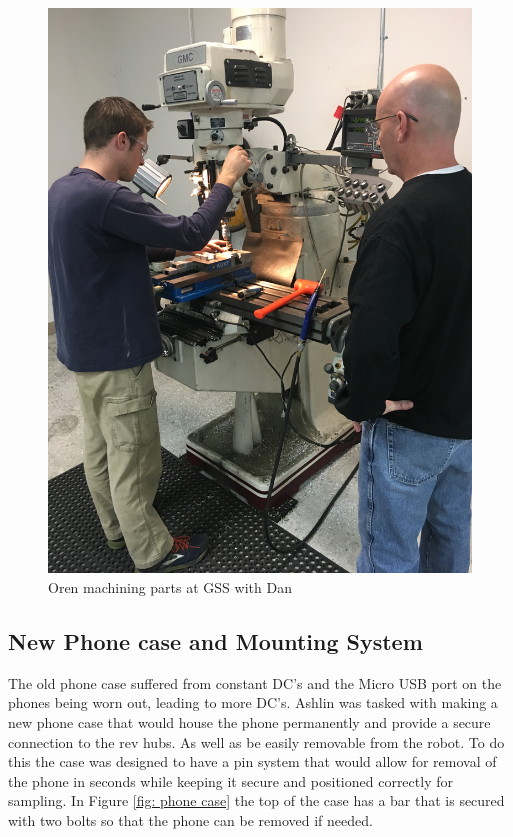 \documentclass{article}
\begin{document}
\begin{figure}
    \centering
    \includegraphics[width= 0.5 \textwidth, angle=270]{25_02-18/images/machining.JPG}
    \caption{Oren machining parts at GSS with Dan}
    \label{fig: oren machining}
\end{figure}



\subsection{New Phone case and  Mounting System}
The old phone case suffered from constant DC's and the Micro USB port on the phones being worn out, leading to more DC's. Ashlin was tasked with making a new phone case that would house the phone permanently and provide a secure connection to the rev hubs. As well as be easily removable from the robot. To do this the case was designed to have a pin system that would allow for removal of the phone in seconds while keeping it secure and positioned correctly for sampling. In Figure \ref{fig: phone case} the top of the case has a bar that is secured with two bolts so that the phone can be removed if needed.
\end{document}
